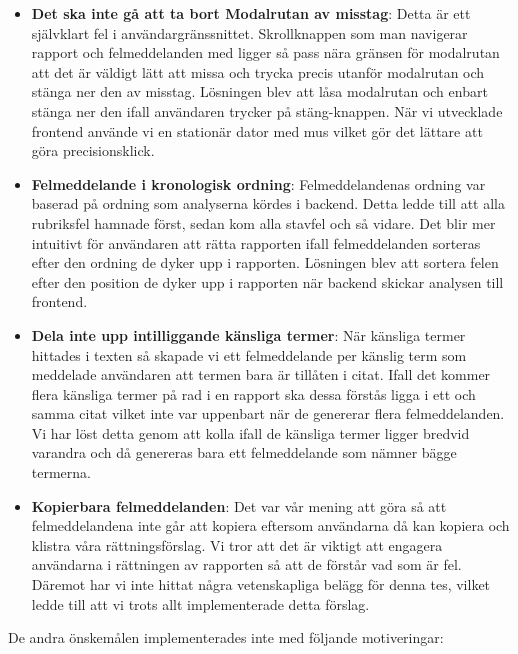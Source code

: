 \documentclass[swedish]{maucsthesis}
\begin{document}
\begin{itemize}
\item \textbf{Det ska inte gå att ta bort Modalrutan av misstag}: Detta är ett
  självklart fel i användargränssnittet. Skrollknappen som man navigerar rapport
  och felmeddelanden med ligger så pass nära gränsen för modalrutan att det är
  väldigt lätt att missa och trycka precis utanför modalrutan och stänga ner den
  av misstag. Lösningen blev att låsa modalrutan och enbart stänga ner den ifall
  användaren trycker på stäng-knappen. När vi utvecklade frontend använde vi en
  stationär dator med mus vilket gör det lättare att göra precisionsklick.
\item \textbf{Felmeddelande i kronologisk ordning}: Felmeddelandenas ordning var
  baserad på ordning som analyserna kördes i backend. Detta ledde till att alla
  rubriksfel hamnade först, sedan kom alla stavfel och så vidare. Det blir mer
  intuitivt för användaren att rätta rapporten ifall felmeddelanden sorteras
  efter den ordning de dyker upp i rapporten. Lösningen blev att sortera felen
  efter den position de dyker upp i rapporten när backend skickar analysen till
  frontend.
\item \textbf{Dela inte upp intilliggande känsliga termer}: När känsliga termer
  hittades i texten så skapade vi ett felmeddelande per känslig term som
  meddelade användaren att termen bara är tillåten i citat. Ifall det kommer
  flera känsliga termer på rad i en rapport ska dessa förstås ligga i ett och
  samma citat vilket inte var uppenbart när de genererar flera felmeddelanden.
  Vi har löst detta genom att kolla ifall de känsliga termer ligger bredvid
  varandra och då genereras bara ett felmeddelande som nämner bägge termerna.
  
\item \textbf{Kopierbara felmeddelanden}: Det var vår mening att göra så att felmeddelandena inte går att kopiera eftersom användarna då kan kopiera och klistra våra rättningsförslag. Vi tror att det är viktigt att engagera användarna i rättningen av rapporten så att de förstår vad som är fel. Däremot har vi inte hittat några vetenskapliga belägg för denna tes, vilket ledde till att vi trots allt implementerade detta förslag.
\end{itemize}

De andra önskemålen implementerades inte med följande motiveringar:
\end{document}

